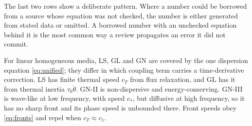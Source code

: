 The last two rows show a deliberate pattern. Where a number could be borrowed from a source whose
equation was not checked, the number is either generated from stated data or omitted. A borrowed
number with an unchecked equation behind it is the most common way a review propagates an error it did not
commit.

\begin{summarybox}[Summary]
For linear homogeneous media, LS, GL and GN are covered by the one dispersion equation \eqref{eq:unified}; they differ in which coupling term carries a time-derivative correction. LS has finite thermal speed $c_T$ from flux relaxation, and GL has it from thermal inertia $\tau_0\ddot\theta$. GN-II is non-dispersive and energy-conserving. GN-III is wave-like at low frequency, with speed $c_*$, but diffusive at high frequency, so it has no sharp front and its phase speed is unbounded there. Front speeds obey \eqref{eq:fronts} and repel when $c_T\approx c_1$.
\end{summarybox}
